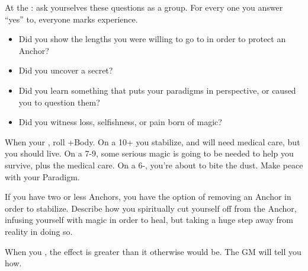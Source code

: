 \begin{multicols}{3}
  \columnbreak

  \begin{move}
    At the : ask yourselves these questions as
    a group. For every one you answer ``yes'' to, everyone marks
    experience.
    \begin{itemize}
      \setlength\itemsep{0em}
    \item Did you show the lengths you were willing to go to in order
      to protect an Anchor?
    \item Did you uncover a secret?
    \item Did you learn something that puts your paradigms in
      perspective, or caused you to question them?
    \item Did you witness loss, selfishness, or pain born of magic?
    \end{itemize}
  \end{move}

  \SEPARATOR
  
  \begin{move}
    When your , roll +Body. On a 10+ you
    stabilize, and will need medical care, but you should live. On a
    7-9, some serious magic is going to be needed to help you survive,
    plus the medical care. On a 6-, you're about to bite the
    dust. Make peace with your Paradigm.

    If you have two or less Anchors, you have the option of removing
    an Anchor in order to stabilize. Describe how you spiritually cut
    yourself off from the Anchor, infusing yourself with magic in
    order to heal, but taking a huge step away from reality in doing
    so.
  \end{move}

  \SEPARATOR

  \begin{move}
    When you , the
    effect is greater than it otherwise would be. The GM will tell you
    how.
  \end{move}  

\end{multicols}

